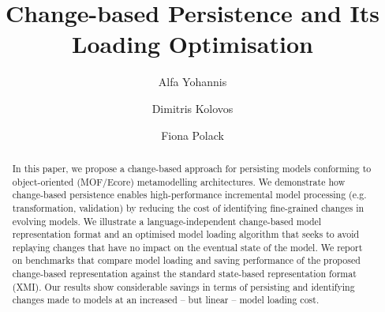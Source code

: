 \documentclass[sigconf]{acmart}
\begin{document}
\renewcommand{\thelstlisting}{\arabic{lstlisting}}
\renewcommand{\labelitemi}{$\bullet$}
\newcommand{\ts}{\textsuperscript}

\title{Change-based Persistence and Its Loading Optimisation}


\author{Alfa Yohannis}

\author{Dimitris Kolovos}

\author{Fiona Polack}

\renewcommand{\shortauthors}{A. Yohannis et al.}


\begin{abstract}
In this paper, we propose a change-based approach for persisting models conforming to object-oriented (MOF/Ecore) metamodelling architectures. We demonstrate how change-based persistence enables high-performance incremental model processing (e.g. transformation, validation) by reducing the cost of identifying fine-grained changes in evolving models. We illustrate a language-independent change-based model representation format and an optimised model loading algorithm that seeks to avoid replaying changes that have no impact on the eventual state of the model. We report on benchmarks that compare model loading and saving performance of the proposed change-based representation against the standard state-based representation format (XMI). Our results show considerable savings in terms of persisting and identifying changes made to models at an increased -- but linear -- model loading cost.

\end{abstract}
\end{document}
